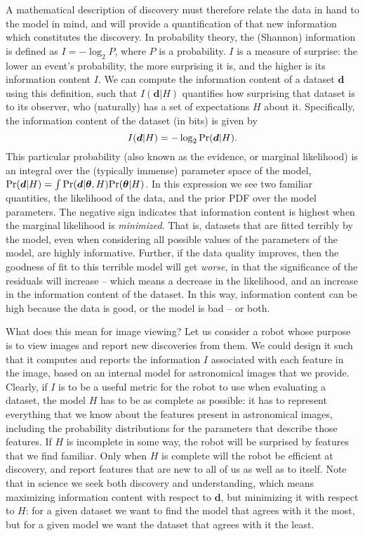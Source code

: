 \documentclass[letterpaper, 11pt]{article}
\begin{document}
A mathematical description of discovery must therefore relate the data in hand
to the model in mind, and will provide a quantification of that new
information which constitutes the discovery.  In probability theory, the
(Shannon) information is defined as $I = -\log_2 P$, where $P$ is a
probability. $I$ is a measure of surprise: the lower an event's probability,
the more surprising it is, and the higher is its information content $I$. We
can  compute the  information content of a dataset $\boldsymbol{d}$ using this
definition, such that $I(\boldsymbol{d}|H)$ quantifies how surprising that
dataset is to its observer, who (naturally)  has a set of expectations $H$
about it.  Specifically, the information content of the dataset (in bits) is
given by
\begin{equation}
I(\boldsymbol{d}|H) = -\log_2 {\rm Pr}(\boldsymbol{d}|H).
\end{equation}  
This particular probability (also known as the evidence, or marginal
likelihood) is an integral over the (typically immense) parameter space of the
model, 
${\rm Pr}(\boldsymbol{d}|H) = 
\int {\rm Pr}(\boldsymbol{d}|\boldsymbol{\theta},H)
     {\rm Pr}(\boldsymbol{\theta}|H)$. In this expression 
we see two familiar quantities, the likelihood of the data, and the prior PDF
over the model parameters.  The negative sign indicates that information
content is highest when the marginal likelihood is {\it minimized}. That is,
datasets  that are fitted terribly by the model, even when considering all
possible  values of the parameters of the model, are highly informative. 
Further, if the data quality improves, then the goodness of fit to this
terrible model  will get {\it worse}, in that the significance of the
residuals will increase -- which means a decrease in the likelihood, and an
increase in the information content of the dataset. In this way,  information
content can be high because the data is good, or the model is bad -- or both.
 
What does this mean for image viewing?  Let us consider a robot whose purpose
is to view images and report new discoveries from them. We could design it
such that it computes and reports the information $I$ associated with each
feature in the image, based on an internal model for astronomical images that
we provide.  Clearly, if $I$ is to be a useful metric for the robot to use
when  evaluating a dataset, the model $H$ has to be as complete as possible:
it has to represent everything that we know about the features present in 
astronomical images, including the probability distributions for the
parameters that describe those features. If $H$ is incomplete in some way, the
robot will be surprised by features that we find familiar. Only when $H$ is
complete will the robot be efficient at discovery, and report features that
are new to all of us as well as to itself. Note that in science we seek both
discovery and understanding, which means maximizing information content with
respect to $\boldsymbol{d}$, but minimizing it with respect to $H$: for a
given dataset we want to find the model that agrees with it the most, but for
a given model we want the dataset that agrees with it the least. 
\end{document}
